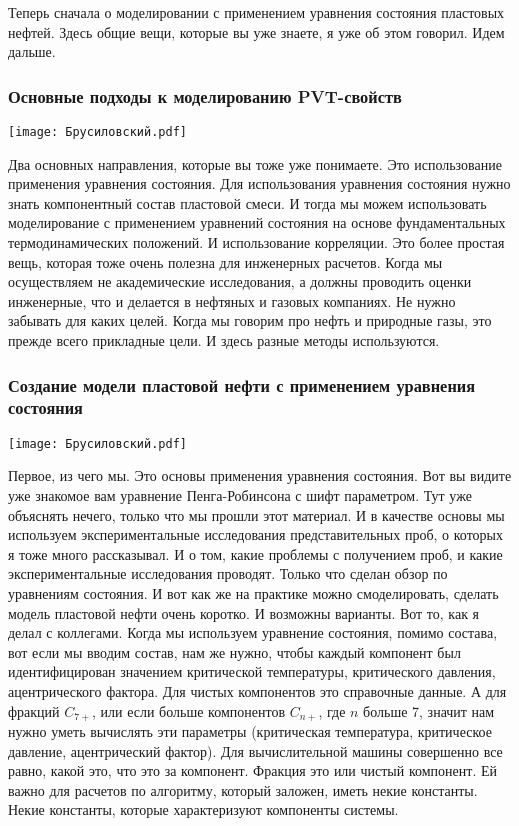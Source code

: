 \documentclass[main.tex]{subfiles}
\begin{document}
Теперь сначала о моделировании с применением уравнения состояния пластовых нефтей.
Здесь общие вещи, которые вы уже знаете, я уже об этом говорил.
Идем дальше.

\subsubsection{Основные подходы к моделированию PVT-свойств}

\begin{center}
\texttt{[image: Брусиловский.pdf]}
\end{center}

Два основных направления, которые вы тоже уже понимаете.
Это использование применения уравнения состояния.
Для использования уравнения состояния нужно знать компонентный состав пластовой смеси.
И тогда мы можем использовать моделирование с применением уравнений состояния на основе фундаментальных термодинамических положений.
И использование корреляции.
Это более простая вещь, которая тоже очень полезна для инженерных расчетов.
Когда мы осуществляем не академические исследования, а должны проводить оценки инженерные, что и делается в нефтяных и газовых компаниях.
Не нужно забывать для каких целей.
Когда мы говорим про нефть и природные газы, это прежде всего прикладные цели.
И здесь разные методы используются.

\subsubsection{Создание модели пластовой нефти с применением уравнения состояния}

\begin{center}
\texttt{[image: Брусиловский.pdf]}
\end{center}

Первое, из чего мы.
Это основы применения уравнения состояния.
Вот вы видите уже знакомое вам уравнение Пенга-Робинсона с шифт параметром.
Тут уже объяснять нечего, только что мы прошли этот материал.
И в качестве основы мы используем экспериментальные исследования представительных проб, о которых я тоже много рассказывал.
И о том, какие проблемы с получением проб, и какие экспериментальные исследования проводят.
Только что сделан обзор по уравнениям состояния.
И вот как же на практике можно смоделировать, сделать модель пластовой нефти очень коротко.
И возможны варианты.
Вот то, как я делал с коллегами.
Когда мы используем уравнение состояния, помимо состава, вот если мы вводим состав, нам же нужно, чтобы каждый компонент был идентифицирован значением критической температуры, критического давления, ацентрического фактора.
Для чистых компонентов это справочные данные.
А для фракций $C_{7+}$, или если больше компонентов $C_{n+}$, где $n$ больше 7, значит нам нужно уметь вычислять эти параметры (критическая температура, критическое давление, ацентрический фактор).
Для вычислительной машины совершенно все равно, какой это, что это за компонент.
Фракция это или чистый компонент.
Ей важно для расчетов по алгоритму, который заложен, иметь некие константы.
Некие константы, которые характеризуют компоненты системы.
\end{document}
